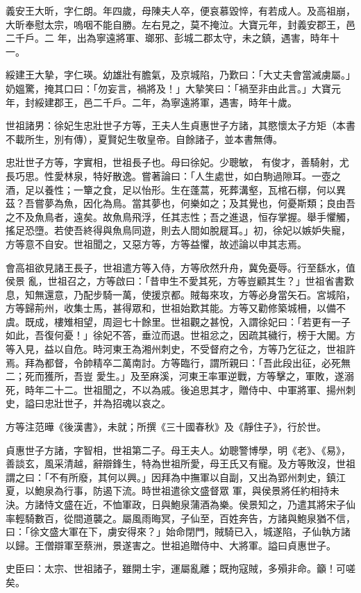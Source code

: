 \begin{pinyinscope}
 義安王大昕，字仁朗。年四歲，母陳夫人卒，便哀慕毀悴，有若成人。及高祖崩，大昕奉慰太宗，嗚咽不能自勝。左右見之，莫不掩泣。大寶元年，封義安郡王，邑二千戶。二
 年，出為寧遠將軍、瑯邪、彭城二郡太守，未之鎮，遇害，時年十一。



 綏建王大摯，字仁瑛。幼雄壯有膽氣，及京城陷，乃歎曰：「大丈夫會當滅虜屬。」奶媼驚，掩其口曰：「勿妄言，禍將及！」大摯笑曰：「禍至非由此言。」大寶元年，封綏建郡王，邑二千戶。二年，為寧遠將軍，遇害，時年十歲。



 世祖諸男：徐妃生忠壯世子方等，王夫人生貞惠世子方諸，其愍懷太子方矩（本書不載所生，別有傳），夏賢妃生敬皇帝。自餘諸子，並本書無傳。



 忠壯世子方等，字實相，世祖長子也。母曰徐妃。少聰敏，
 有俊才，善騎射，尤長巧思。性愛林泉，特好散逸。嘗著論曰：「人生處世，如白駒過隙耳。一壺之酒，足以養性；一簞之食，足以怡形。生在蓬蒿，死葬溝壑，瓦棺石槨，何以異茲？吾嘗夢為魚，因化為鳥。當其夢也，何樂如之；及其覺也，何憂斯類；良由吾之不及魚鳥者，遠矣。故魚鳥飛浮，任其志性；吾之進退，恒存掌握。舉手懼觸，搖足恐墮。若使吾終得與魚鳥同遊，則去人間如脫屣耳。」初，徐妃以嫉妒失寵，方等意不自安。世祖聞之，又惡方等，方等益懼，故述論以申其志焉。



 會高祖欲見諸王長子，世祖遣方等入侍，方等欣然升舟，冀免憂辱。行至繇水，值侯景
 亂，世祖召之，方等啟曰：「昔申生不愛其死，方等豈顧其生？」世祖省書歎息，知無還意，乃配步騎一萬，使援京都。賊每來攻，方等必身當矢石。宮城陷，方等歸荊州，收集士馬，甚得眾和，世祖始歎其能。方等又勸修築城柵，以備不虞。既成，樓雉相望，周迴七十餘里。世祖觀之甚悅，入謂徐妃曰：「若更有一子如此，吾復何憂！」徐妃不答，垂泣而退。世祖忿之，因疏其穢行，榜于大閣。方等入見，益以自危。時河東王為湘州刺史，不受督府之令，方等乃乞征之，世祖許焉。拜為都督，令帥精卒二萬南討。方等臨行，謂所親曰：「吾此段出征，必死無二；死而獲所，吾豈
 愛生。」及至麻溪，河東王率軍逆戰，方等擊之，軍敗，遂溺死，時年二十二。世祖聞之，不以為戚。後追思其才，贈侍中、中軍將軍、揚州刺史，謚曰忠壯世子，并為招魂以哀之。



 方等注范曄《後漢書》，未就；所撰《三十國春秋》及《靜住子》，行於世。



 貞惠世子方諸，字智相，世祖第二子。母王夫人。幼聰警博學，明《老》、《易》，善談玄，風采清越，辭辯鋒生，特為世祖所愛，母王氏又有寵。及方等敗沒，世祖謂之曰：「不有所廢，其何以興。」因拜為中撫軍以自副，又出為郢州刺史，鎮江夏，以鮑泉為行事，防遏下流。時世祖遣徐文盛督眾
 軍，與侯景將任約相持未決。方諸恃文盛在近，不恤軍政，日與鮑泉蒲酒為樂。侯景知之，乃遣其將宋子仙率輕騎數百，從間道襲之。屬風雨晦冥，子仙至，百姓奔告，方諸與鮑泉猶不信，曰：「徐文盛大軍在下，虜安得來？」始命閉門，賊騎已入，城遂陷，子仙執方諸以歸。王僧辯軍至蔡洲，景遂害之。世祖追贈侍中、大將軍。謚曰貞惠世子。



 史臣曰：太宗、世祖諸子，雖開土宇，運屬亂離；既拘寇賊，多殞非命。籲！可嗟矣。



\end{pinyinscope}